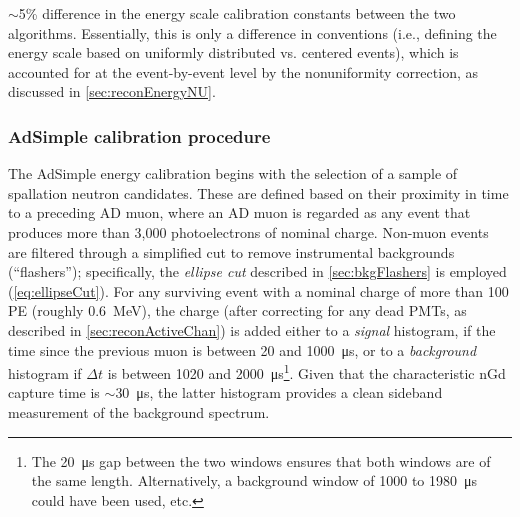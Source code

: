 \documentclass[../thesis.tex]{subfiles}
\begin{document}
$\sim$5\% difference in the energy scale calibration constants between the two algorithms. Essentially, this is only a difference in conventions (i.e., defining the energy scale based on uniformly distributed vs. centered events), which is accounted for at the event-by-event level by the nonuniformity correction, as discussed in \autoref{sec:reconEnergyNU}.

\begin{comment}
  A sample enriched in such neutrons is obtained by selecting events in a time window (XXX define) immediately after AD muons (XXX of what minimum energy?). These captures are distributed uniformly throughout the GdLS, much like IBDs. The nGd capture peak in the charge distribution is fit to a Gaussian (XXX crystal ball?), and the location of the peak is defined as corresponding to 7.95 MeV (XXX) 8.0 MeV according to doc-7334 (AdSimple). This energy scale is stored in the offline database, valid for the period in which the neutrons were collected. In the near (far) halls, it takes XXX (YYY) days to obtain the necessary statistics; this is thus the time-resolution of the energy scale, which is sufficient, given that the light yield changes very slowly, declining by some 1\% to 1.5\% per year.
  
24 hours
\end{comment}

\begin{comment}
  Figure out exactly what energy is pegged by AdSimple and AdScaled. 7.95 MeV? Discuss differences (e.g. due to muon afterpulsing?)
  5x15min Co60
  4x10hour AmC
\end{comment}

\subsubsection{AdSimple calibration procedure}
\label{sec:reconEnergyAdSimpleCalib}

The AdSimple energy calibration begins with the selection of a sample of spallation neutron candidates. These are defined based on their proximity in time to a preceding AD muon, where an AD muon is regarded as any event that produces more than 3,000 photoelectrons of nominal charge. Non-muon events are filtered through a simplified cut to remove instrumental backgrounds (``flashers''); specifically, the \emph{ellipse cut} described in \autoref{sec:bkgFlashers} is employed (\autoref{eq:ellipseCut}). For any surviving event with a nominal charge of more than 100 PE (roughly 0.6~MeV), the charge (after correcting for any dead PMTs, as described in \autoref{sec:reconActiveChan}) is added either to a \emph{signal} histogram, if the time since the previous muon is between 20 and \SI{1000}{\micro s}, or to a \emph{background} histogram if $\Delta t$ is between 1020 and \SI{2000}{\micro s}\footnote{The \SI{20}{\micro s} gap between the two windows ensures that both windows are of the same length. Alternatively, a background window of 1000 to \SI{1980}{\micro s} could have been used, etc.}. Given that the characteristic nGd capture time is $\sim$\SI{30}{\micro s}, the latter histogram provides a clean sideband measurement of the background spectrum.
\end{document}

